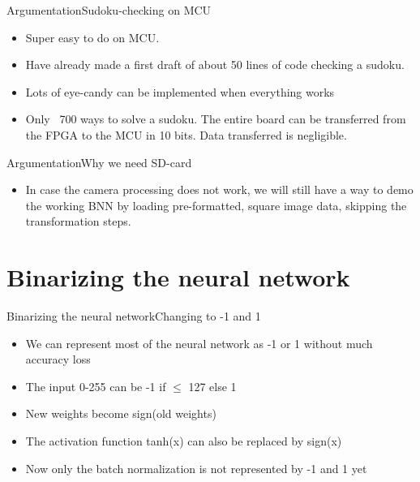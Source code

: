 \documentclass[10pt]{beamer}
\begin{document}
\begin{frame}{Argumentation}{Sudoku-checking on MCU}
\begin{itemize}
\item Super easy to do on MCU.
\item Have already made a first draft of about 50 lines of code checking a sudoku.
\item Lots of eye-candy can be implemented when everything works
\item Only ~700 ways to solve a sudoku. The entire board can be transferred from the FPGA to the MCU in 10 bits. Data transferred is negligible.
\end{itemize}
\end{frame}

\begin{frame}{Argumentation}{Why we need SD-card}
\begin{itemize}
\item In case the camera processing does not work, we will still have a way to demo the working BNN by loading pre-formatted, square image data, skipping the transformation steps.
\end{itemize}
\end{frame}


\section{Binarizing the neural network}
\begin{frame}{Binarizing the neural network}{Changing to -1 and 1}
\begin{itemize}
	\item We can represent most of the neural network as -1 or 1 without much accuracy loss
	\item The input 0-255 can be -1 if $\leq$ 127 else 1
	\item New weights become sign(old weights)
	\item The activation function tanh(x) can also be replaced by sign(x)
	\item Now only the batch normalization is not represented by -1 and 1 yet
\end{itemize}
\end{frame}
\end{document}

